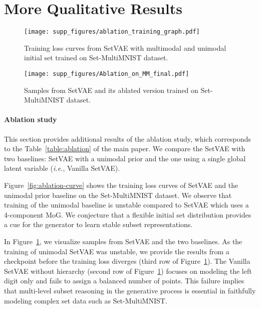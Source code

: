 \documentclass[final]{arxiv/cvpr}
\begin{document}
\section{More Qualitative Results}

\begin{figure}[!t]
    \centering
    \texttt{[image: supp\_figures/ablation\_training\_graph.pdf]}
    \caption{Training loss curves from SetVAE with multimodal and unimodal initial set trained on Set-MultiMNIST dataset.}
    \label{fig:ablation-curve}
    \centering
    \texttt{[image: supp\_figures/Ablation\_on\_MM\_final.pdf]}
    \caption{Samples from SetVAE and its ablated version trained on Set-MultiMNIST dataset.}
    \label{fig:ablation}
    \vspace{-0.2in}
\end{figure}

\paragraph{Ablation study}
This section provides additional results of the ablation study, which corresponds to the Table~\ref{table:ablation} of the main paper.
We compare the SetVAE with two baselines: SetVAE with a unimodal prior and the one using a single global latent variable (\emph{i.e.}, Vanilla SetVAE).

Figure~\ref{fig:ablation-curve} shows the training loss curves of SetVAE and the unimodal prior baseline on the Set-MultiMNIST dataset.
We observe that training of the unimodal baseline is unstable compared to SetVAE which uses a 4-component MoG.
We conjecture that a flexible initial set distribution provides a cue for the generator to learn stable subset representations.

In Figure~\ref{fig:ablation}, we visualize samples from SetVAE and the two baselines.
As the training of unimodal SetVAE was unstable, we provide the results from a checkpoint before the training loss diverges (third row of Figure~\ref{fig:ablation}).
The Vanilla SetVAE without hierarchy (second row of Figure~\ref{fig:ablation}) focuses on modeling the left digit only and fails to assign a balanced number of points.
This failure implies that multi-level subset reasoning in the generative process is essential in faithfully modeling complex set data such as Set-MultiMNIST.
\end{document}
